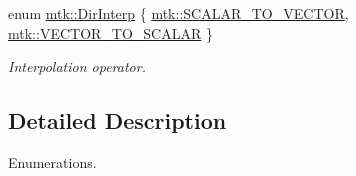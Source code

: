 \begin{DoxyCompactItemize}
enum \hyperlink{group__c02-enums_ga674ec67bd1baa04e5dc06c2bcc351972}{mtk\+::\+Dir\+Interp} \{ \hyperlink{group__c02-enums_ga674ec67bd1baa04e5dc06c2bcc351972abc9e2b8cd5a497c9f3252a792e356139}{mtk\+::\+S\+C\+A\+L\+A\+R\+\_\+\+T\+O\+\_\+\+V\+E\+C\+T\+O\+R}, 
\hyperlink{group__c02-enums_ga674ec67bd1baa04e5dc06c2bcc351972a122cf2e24aef105e9214698206af6904}{mtk\+::\+V\+E\+C\+T\+O\+R\+\_\+\+T\+O\+\_\+\+S\+C\+A\+L\+A\+R}
 \}
\begin{DoxyCompactList}\small\item\em Interpolation operator. \end{DoxyCompactList}\end{DoxyCompactItemize}


\subsection{Detailed Description}
Enumerations. 

